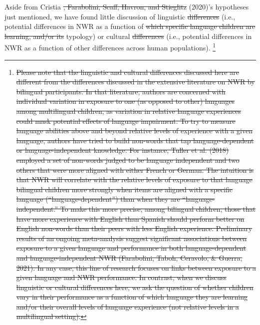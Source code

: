 \documentclass[english,,man,floatsintext]{apa6} %
\providecommand{\DIFaddtex}[1]{{\protect\color{blue}\uwave{#1}}} %
\providecommand{\DIFdeltex}[1]{{\protect\color{red}\sout{#1}}}                      %
\providecommand{\DIFaddbegin}{} %
\providecommand{\DIFaddend}{} %
\providecommand{\DIFdelbegin}{} %
\providecommand{\DIFdelend}{} %
\providecommand{\DIFadd}[1]{\texorpdfstring{\DIFaddtex{#1}}{#1}} %
\providecommand{\DIFdel}[1]{\texorpdfstring{\DIFdeltex{#1}}{}} %
\newcommand{\DIFscaledelfig}{0.5}
\newlength{\DIFdelgraphicswidth} %
\newlength{\DIFdelgraphicsheight} %
\newcommand{\DIFaddincludegraphics}[2][]{{\color{blue}\fbox{\DIFOincludegraphics[#1]{#2}}}} %
\newcommand{\DIFdelincludegraphics}[2][]{%
	\sbox{\DIFdelgraphicsbox}{\DIFOincludegraphics[#1]{#2}}%
	\settoboxwidth{\DIFdelgraphicswidth}{\DIFdelgraphicsbox} %
	\settoboxtotalheight{\DIFdelgraphicsheight}{\DIFdelgraphicsbox} %
	\scalebox{\DIFscaledelfig}{%
		\parbox[b]{\DIFdelgraphicswidth}{\usebox{\DIFdelgraphicsbox}\\[-\baselineskip] \rule{\DIFdelgraphicswidth}{0em}}\llap{\resizebox{\DIFdelgraphicswidth}{\DIFdelgraphicsheight}{%
				\setlength{\unitlength}{\DIFdelgraphicswidth}%
				\begin{picture}(1,1)%
				\thicklines\linethickness{2pt} %
				{\color[rgb]{1,0,0}\put(0,0){\framebox(1,1){}}}%
				{\color[rgb]{1,0,0}\put(0,0){\line( 1,1){1}}}%
				{\color[rgb]{1,0,0}\put(0,1){\line(1,-1){1}}}%
				\end{picture}%
			}\hspace*{3pt}}} %
} %
\DeclareRobustCommand{\DIFaddbegin}{\DIFOaddbegin \let\includegraphics\DIFaddincludegraphics} %
\DeclareRobustCommand{\DIFaddend}{\DIFOaddend \let\includegraphics\DIFOincludegraphics} %
\DeclareRobustCommand{\DIFdelbegin}{\DIFOdelbegin \let\includegraphics\DIFdelincludegraphics} %
\DeclareRobustCommand{\DIFdelend}{\DIFOaddend \let\includegraphics\DIFOincludegraphics} %
\begin{document}
\DIFdelend Aside from Cristia \DIFdelbegin \DIFdel{, Farabolini, Scaff, Havron, and Stieglitz }\DIFdelend \DIFaddbegin \DIFadd{et al. }\DIFaddend (2020)'s hypotheses just mentioned, we have found little discussion of linguistic \DIFdelbegin \DIFdel{differences }\DIFdelend \DIFaddbegin \DIFadd{effects }\DIFaddend (i.e., potential differences in NWR as a function of \DIFdelbegin \DIFdel{which specific language children are learning, and/or its }\DIFdelend \DIFaddbegin \DIFadd{language }\DIFaddend typology) or cultural \DIFdelbegin \DIFdel{differences }\DIFdelend \DIFaddbegin \DIFadd{effects }\DIFaddend (i.e., potential differences in NWR as a function of other differences across human populations). \DIFdelbegin \footnote{\DIFdel{Please note that the linguistic and cultural differences discussed here are different from the differences discussed in the extensive literature on NWR by bilingual participants. In that literature, authors are concerned with individual variation in exposure to one (as opposed to other) languages among multilingual children, as variation in relative language experiences could mask potential effects of language impairment. To try to measure language abilities above and beyond relative levels of experience with a given language, authors have tried to build non-words that tap language-dependent or language-independent knowledge. For instance, Tuller et al. (2018) employed a set of non-words judged to be language independent and two others that were more aligned with either French or German. The intuition is that NWR will correlate with the relative levels of exposure to that language bilingual children more strongly when items are aligned with a specific language (``language-dependent'') than when they are ``language-independent.'' To make this more precise, among bilingual children, those that have more experience with English than Spanish should perform better on English non-words than their peers with less English experience. Preliminary results of an ongoing meta-analysis suggest significant associations between exposure to a given language and performance in both language-dependent and language-independent NWR (Farabolini, Taboh, Ceravolo, \& Guerra, 2021). In any case, this line of research focuses on links between exposure to a given language and NWR performance. In contrast, when we discuss linguistic or cultural differences here, we ask the question of whether children vary in their performance as a function of which language they are learning and/or their overall levels of language experience (not relative levels in a multilingual setting).}}
\addtocounter{footnote}{-1}%
\end{document}
